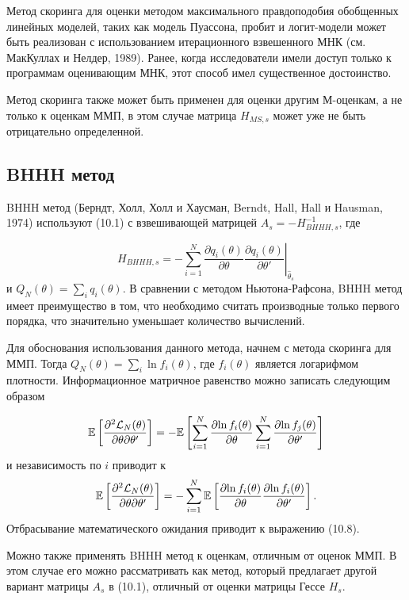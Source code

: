 Метод скоринга для оценки методом максимального правдоподобия обобщенных линейных моделей, таких как модель Пуассона, пробит и логит-модели может быть реализован с использованием итерационного взвешенного МНК (см. МакКуллах и Нелдер, 1989). Ранее, когда исследователи имели доступ только к программам оценивающим МНК, этот способ имел  существенное достоинство.

Метод скоринга также может быть применен для оценки другим М-оценкам, а  не только к оценкам ММП, в этом случае матрица $H_{MS,s}$ может уже не быть отрицательно определенной.


\subsection{BHHH метод}

BHHH метод (Берндт, Холл, Холл и Хаусман, Berndt, Hall, Hall и Hausman, 1974) используют (10.1) с взвешивающей матрицей $A_s = -H^{-1}_{BHHH,s}$, где 

\begin{equation}
H_{BHHH,s} = \left. -\sum^N_{i=1}\dfrac{\partial{q_{i}}(\theta)}{\partial\theta}\dfrac{\partial{q_{i}}(\theta)}{\partial{\theta}'} \right|_{\hat{\theta}_s}
\end{equation}
и $Q_N(\theta) = \sum_{i}q_{i}(\theta)$. В сравнении с методом Ньютона-Рафсона, BHHH метод имеет преимущество в том, что необходимо считать производные только первого порядка, что значительно уменьшает количество вычислений.

Для обоснования использования данного метода, начнем с метода скоринга для ММП. Тогда $Q_N(\theta) = \sum_{i} \ln f_{i}(\theta)$, где $f_i(\theta)$ является логарифмом плотности. Информационное матричное равенство можно записать следующим образом

\[
\mathbb{E}\left[ \dfrac{\partial^2\mathcal{L}_N(\theta)}{\partial{\theta}\partial{\theta}'}\right] = -\mathbb{E}\left[ \sum^N_{i=1}\dfrac{\partial{\ln f_i(\theta)}}{\partial{\theta}}\sum^N_{i=1}\dfrac{\partial{\ln f_j(\theta)}}{\partial{\theta}'}\right] 
\]
и независимость по $i$ приводит к
\[
\mathbb{E}\left[ \dfrac{\partial^2{\mathcal{L}_N(\theta)}}{\partial{\theta}\partial{\theta}'}\right] = -\sum^N_{i=1} \mathbb{E}\left[ \dfrac{\partial{\ln f_i(\theta)}}{\partial{\theta}} \dfrac{\partial {\ln f_i(\theta)}}{\partial{\theta}'}\right]. 
\]
Отбрасывание математического ожидания приводит к выражению (10.8).

Можно также применять BHHH метод к оценкам, отличным от оценок ММП. В этом случае его можно рассматривать как метод, который предлагает другой вариант матрицы $A_s$ в (10.1), отличный от оценки матрицы Гессе $H_s$.

